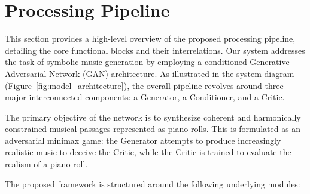 
\section{Processing Pipeline}
\label{sec:processing_architecture}

This section provides a high-level overview of the proposed processing pipeline, detailing the core functional blocks and their interrelations.
Our system addresses the task of symbolic music generation by employing a conditioned Generative Adversarial Network (GAN) architecture.
As illustrated in the system diagram (Figure~\ref{fig:model_architecture}), the overall pipeline revolves around three major interconnected components: a Generator, a Conditioner, and a Critic.

The primary objective of the network is to synthesize coherent and harmonically constrained musical passages represented as piano rolls.
This is formulated as an adversarial minimax game: the Generator attempts to produce increasingly realistic music to deceive the Critic, while the Critic is trained to evaluate the realism of a piano roll.

The proposed framework is structured around the following underlying modules:

